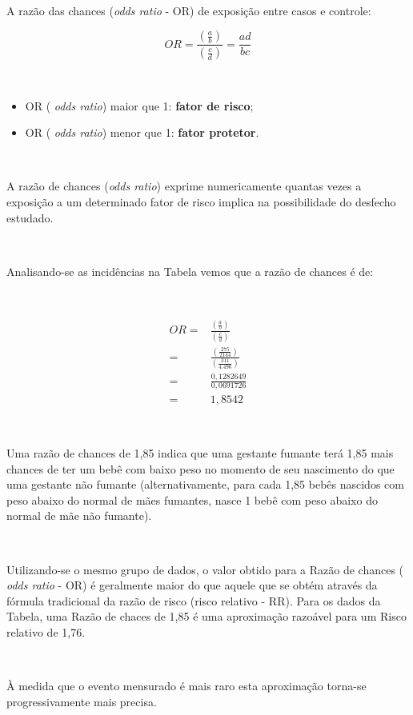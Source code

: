 \documentclass[
]{book}
\providecommand{\tightlist}{%
  \setlength{\itemsep}{0pt}\setlength{\parskip}{0pt}}
\begin{document}
~

A razão das chances (\emph{odds ratio} - OR) de exposição entre casos e controle:

\hfill\break

\[
OR = \frac{\left(\frac{a}{b}\right)}{\left(\frac{c}{d}\right)} = \frac{ad}{bc}
\]

~

\begin{itemize}
\tightlist
\item
  OR ( \emph{odds ratio}) maior que 1: \textbf{fator de risco};
\item
  OR ( \emph{odds ratio}) menor que 1: \textbf{fator protetor}.
\end{itemize}

~

A razão de chances (\emph{odds ratio}) exprime numericamente quantas vezes a exposição a um determinado fator de risco implica na possibilidade do desfecho estudado.

~

Analisando-se as incidências na Tabela vemos que a razão de chances é de:

~

\begin{align*}
OR = & \frac{\left(\frac{a}{b}\right)}{\left(\frac{c}{d}\right)} \\
   = & \frac{\left(\frac{275}{2144}\right)}{\left(\frac{311}{4.496}\right)} \\
   = & \frac{0,1282649}{0,0691726} \\
   = & 1,8542
\end{align*}

~

Uma razão de chances de 1,85 indica que uma gestante fumante terá 1,85 mais chances de ter um bebê com baixo peso no momento de seu nascimento do que uma gestante não fumante (alternativamente, para cada 1,85 bebês nascidos com peso abaixo do normal de mães fumantes, nasce 1 bebê com peso abaixo do normal de mãe não fumante).

~

Utilizando-se o mesmo grupo de dados, o valor obtido para a Razão de chances ( \emph{odds ratio} - OR) é geralmente maior do que aquele que se obtém através da fórmula tradicional da razão de risco (risco relativo - RR). Para os dados da Tabela, uma Razão de chaces de 1,85 é uma aproximação razoável para um Risco relativo de 1,76.

~

À medida que o evento mensurado é mais raro esta aproximação torna-se progressivamente mais precisa.
\end{document}
